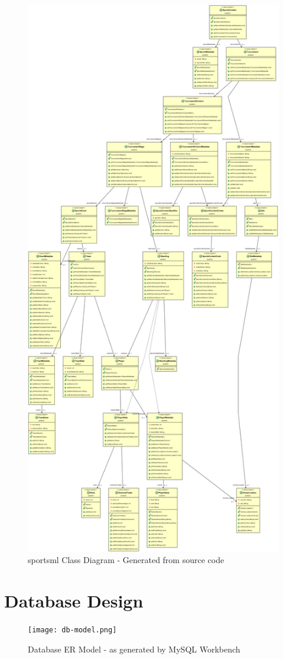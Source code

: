 \begin{figure}[!ht]
  \centering
  \includegraphics[width=\textwidth,height=0.9\textheight,keepaspectratio]{ObjectAid/class-diagram-sportsml.png}
  \caption{sportsml Class Diagram - Generated from source code}
  \label{fig:classDiagramGeneratedSportsml}
\end{figure}
\section{Database Design} \label{sectiondatabaseDesign}
\begin{figure}[!ht]
  \centering
  \texttt{[image: db-model.png]}
  \caption{Database ER Model - as generated by MySQL Workbench}
  \label{fig:databaseERDesignGenerated}
\end{figure}
